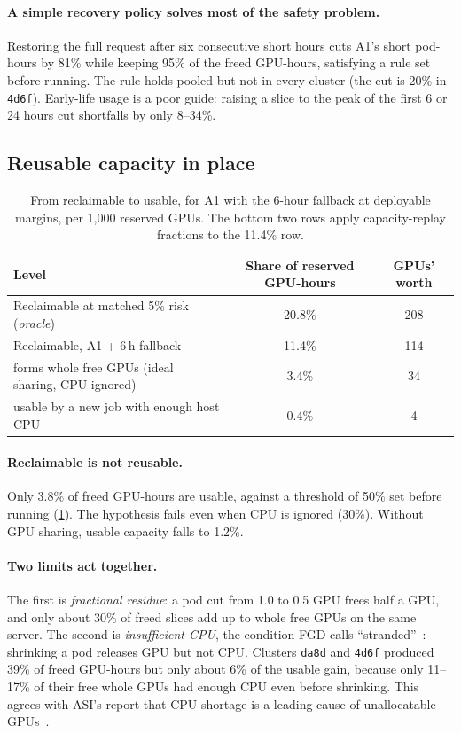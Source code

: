 \documentclass[10pt]{article}
\newcommand{\finding}[1]{\paragraph{#1}}
\begin{document}
\finding{A simple recovery policy solves most of the safety problem.} Restoring the full request after six consecutive short hours cuts A1's short pod-hours by 81\% while keeping 95\% of the freed GPU-hours, satisfying a rule set before running. The rule holds pooled but not in every cluster (the cut is 20\% in \texttt{4d6f}). Early-life usage is a poor guide: raising a slice to the peak of the first 6 or 24 hours cut shortfalls by only 8--34\%.

\subsection{Reusable capacity in place}
\label{sec:q5}

\begin{table}[t]
\centering\small
\caption{From reclaimable to usable, for A1 with the 6-hour fallback at deployable margins, per 1{,}000 reserved GPUs. The bottom two rows apply capacity-replay fractions to the 11.4\% row.}
\label{tab:chain}
\begin{tabular}{@{}lcc@{}}
\toprule
Level & Share of reserved GPU-hours & GPUs' worth \\
\midrule
Reclaimable at matched 5\% risk (\emph{oracle}) & 20.8\% & 208 \\
Reclaimable, A1 + 6\,h fallback & 11.4\% & 114 \\
\quad forms whole free GPUs (ideal sharing, CPU ignored) & 3.4\% & 34 \\
\quad usable by a new job with enough host CPU & 0.4\% & 4 \\
\bottomrule
\end{tabular}
\end{table}

\finding{Reclaimable is not reusable.} Only 3.8\% of freed GPU-hours are usable, against a threshold of 50\% set before running (\cref{tab:chain}). The hypothesis fails even when CPU is ignored (30\%). Without GPU sharing, usable capacity falls to 1.2\%.

\finding{Two limits act together.} The first is \emph{fractional residue}: a pod cut from 1.0 to 0.5 GPU frees half a GPU, and only about 30\% of freed slices add up to whole free GPUs on the same server. The second is \emph{insufficient CPU}, the condition FGD calls ``stranded''~\citep{weng2023fgd}: shrinking a pod releases GPU but not CPU. Clusters \texttt{da8d} and \texttt{4d6f} produced 39\% of freed GPU-hours but only about 6\% of the usable gain, because only 11--17\% of their free whole GPUs had enough CPU even before shrinking. This agrees with ASI's report that CPU shortage is a leading cause of unallocatable GPUs~\citep{li2026asi}.
\end{document}
